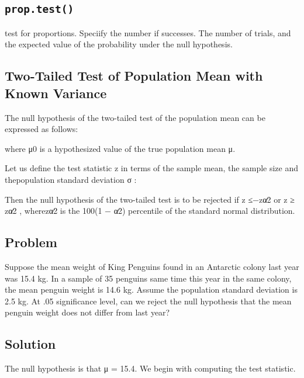 \subsection{ \texttt{prop.test()} }


test for proportions. Speciify the number if successes.  The number of trials, and the expected value of the probability under the null hypothesis.

\subsection{Two-Tailed Test of Population Mean with Known Variance}

The null hypothesis of the two-tailed test of the population mean can be expressed as follows:



where μ0 is a hypothesized value of the true population mean μ.

Let us define the test statistic z in terms of the sample mean, the sample size and thepopulation standard deviation σ :



Then the null hypothesis of the two-tailed test is to be rejected if z ≤−zα∕2 or z ≥ zα∕2 , wherezα∕2 is the 100(1 − α∕2) percentile of the standard normal distribution.

\subsection{Problem}

Suppose the mean weight of King Penguins found in an Antarctic colony last year was 15.4 kg. In a sample of 35 penguins same time this year in the same colony, the mean penguin weight is 14.6 kg. Assume the population standard deviation is 2.5 kg. At .05 significance level, can we reject the null hypothesis that the mean penguin weight does not differ from last year?

\subsection{Solution}

The null hypothesis is that μ = 15.4. We begin with computing the test statistic.

